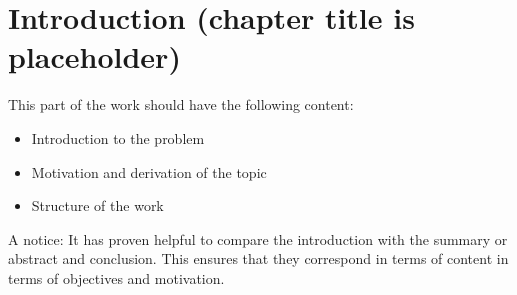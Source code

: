 \section{Introduction (chapter title is placeholder)}

This part of the work should have the following content:

\begin{itemize}
  \item Introduction to the problem
  \item Motivation and derivation of the topic
  \item Structure of the work
\end{itemize}

A notice:
It has proven helpful to compare the introduction with the summary or abstract and conclusion. This ensures that they correspond in terms of content in terms of objectives and motivation.